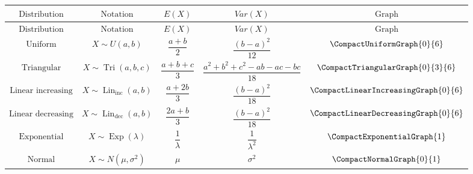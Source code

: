 		{
			\renewcommand{\arraystretch}{1.7}
			
			\begin{longtable}{c|c|c|c|c}
				$\text{Distribution}$
				&
				$\text{Notation}$
				&
				$E(X)$
				&
				$Var(X)$
				&
				$\text{Graph}$
				\\[1mm]
				\hline
				\endfirsthead
				
				$\text{Distribution}$
				&
				$\text{Notation}$
				&
				$E(X)$
				&
				$Var(X)$
				&
				$\text{Graph}$
				\\[1mm]
				\hline
				\endhead
				
				\hline
				\endfoot
				
				$\text{Uniform}$
				&
				$X\sim U(a,b)$
				&
				$\dfrac{a+b}{2}$
				&
				$\dfrac{(b-a)^2}{12}$
				&
				$\vcenter{\hbox{\CompactUniformGraph{0}{6}}}$
				\\[3mm]
				\hline
				
				$\text{Triangular}$
				&
				$X\sim \operatorname{Tri}(a,b,c)$
				&
				$\dfrac{a+b+c}{3}$
				&
				$\dfrac{a^2+b^2+c^2-ab-ac-bc}{18}$
				&
				$\vcenter{\hbox{\CompactTriangularGraph{0}{3}{6}}}$
				\\[3mm]
				\hline
				
				$\text{Linear increasing}$
				&
				$X\sim \operatorname{Lin}_{\mathrm{inc}}(a,b)$
				&
				$\dfrac{a+2b}{3}$
				&
				$\dfrac{(b-a)^2}{18}$
				&
				$\vcenter{\hbox{\CompactLinearIncreasingGraph{0}{6}}}$
				\\[3mm]
				\hline
				
				$\text{Linear decreasing}$
				&
				$X\sim \operatorname{Lin}_{\mathrm{dec}}(a,b)$
				&
				$\dfrac{2a+b}{3}$
				&
				$\dfrac{(b-a)^2}{18}$
				&
				$\vcenter{\hbox{\CompactLinearDecreasingGraph{0}{6}}}$
				\\[3mm]
				\hline
				
				$\text{Exponential}$
				&
				$X\sim \operatorname{Exp}(\lambda)$
				&
				$\dfrac{1}{\lambda}$
				&
				$\dfrac{1}{\lambda^2}$
				&
				$\vcenter{\hbox{\CompactExponentialGraph{1}}}$
				\\[3mm]
				\hline
				
				$\text{Normal}$
				&
				$X\sim N(\mu,\sigma^2)$
				&
				$\mu$
				&
				$\sigma^2$
				&
				$\vcenter{\hbox{\CompactNormalGraph{0}{1}}}$
				
			\end{longtable}
		}
